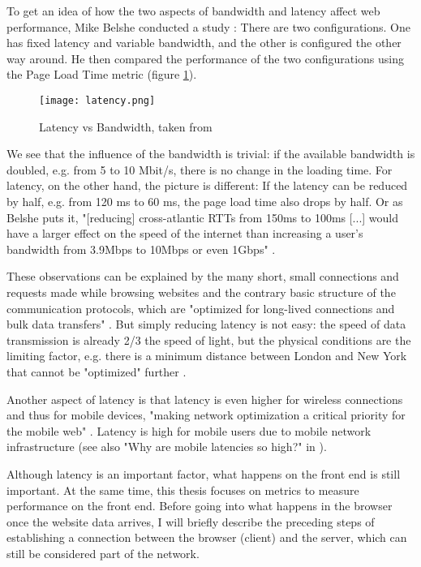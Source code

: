 To get an idea of how the two aspects of bandwidth and latency affect web performance, Mike Belshe conducted a study \cite{2010Belshe}:
There are two configurations. One has fixed latency and variable bandwidth, and the other is configured the other way around.
He then compared the performance of the two configurations using the Page Load Time metric (figure \ref{figure:latency}).


\begin{figure}[h!]
\begin{center}
\texttt{[image: latency.png]}
\caption{Latency vs Bandwidth, taken from \cite{2013Grigorik}}
\label{figure:latency}
\end{center}
\end{figure}


We see that the influence of the bandwidth is trivial: if the available bandwidth is doubled, e.g. from 5 to 10 Mbit/s, there is no change in the loading time.
For latency, on the other hand, the picture is different: If the latency can be reduced by half, e.g. from 120 ms to 60 ms, the page load time also drops by half.
Or as Belshe puts it, "[reducing] cross-atlantic RTTs from 150ms to 100ms [...] would have a larger effect on the speed of the internet than increasing a user's bandwidth from 3.9Mbps to 10Mbps or even 1Gbps" \cite{2010Belshe}.

These observations can be explained by the many short, small connections and requests made while browsing websites and the contrary basic structure of the communication protocols, which are "optimized for long-lived connections and bulk data transfers" \cite{2013Grigorik}. %
But simply reducing latency is not easy: the speed of data transmission is already 2/3 the speed of light, but the physical conditions are the limiting factor, e.g. there is a minimum distance between London and New York that cannot be "optimized" further \cite{2013Grigorik}. %



Another aspect of latency is that latency is even higher for wireless connections and thus for mobile devices, "making network optimization a critical priority for the mobile web" \cite{2013Grigorik}. %
Latency is high for mobile users due to mobile network infrastructure (see also "Why are mobile latencies so high?" in \cite{2013Grigorik}).



Although latency is an important factor, what happens on the front end is still important.
At the same time, this thesis focuses on metrics to measure performance on the front end.
Before going into what happens in the browser once the website data arrives, I will briefly describe the preceding steps of establishing a connection between the browser (client) and the server, which can still be considered part of the network.


